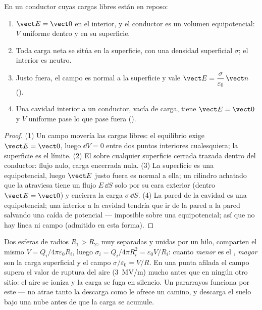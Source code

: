 \begin{theorem}\label{thm:b1:potential-capacitors:conductor}
En un conductor cuyas cargas libres están en reposo:
\begin{enumerate}
  \item $\vect E = \vect 0$ en el interior, y el conductor es un volumen
        equipotencial: $V$ uniforme dentro y en su superficie.
  \item Toda carga neta se sitúa en la superficie, con una densidad
        superficial $\sigma$; el interior es neutro.
  \item Justo fuera, el campo es normal a la superficie y vale
        $\vect E = \dfrac{\sigma}{\varepsilon_0}\,\vect n$ (\emph{}).
  \item Una cavidad interior a un conductor, vacía de carga, tiene $\vect E =
        \vect 0$ y $V$ uniforme pase lo que pase fuera (\emph{}).
\end{enumerate}
\end{theorem}

\begin{proof}
(1) Un campo movería las cargas libres: el equilibrio exige $\vect E =
\vect 0$, luego $\dd V = 0$ entre dos puntos interiores cualesquiera; la
superficie es el límite. (2) El  sobre cualquier
superficie cerrada trazada dentro del conductor: flujo nulo, carga
encerrada nula. (3) La superficie es una equipotencial, luego $\vect E$
justo fuera es normal a ella; un cilindro achatado que la atraviesa tiene
un flujo $E\,\dd S$ solo por su cara exterior (dentro $\vect E = \vect 0$)
y encierra la carga $\sigma\,\dd S$. (4) La pared de la cavidad es una
equipotencial; una  interior a la cavidad tendría que ir de
la pared a la pared salvando una caída de potencial --- imposible sobre
una equipotencial; así que no hay línea ni campo (admitido en esta forma).
\end{proof}

\begin{example}\label{ex:b1:potential-capacitors:point}
Dos esferas de radios $R_1 > R_2$, muy separadas y unidas por un hilo,
comparten el mismo $V = Q_i/4\pi\varepsilon_0R_i$, luego $\sigma_i = Q_i/4\pi R_i^2 = \varepsilon_0V/R_i$:
cuanto \emph{menor} es el , \emph{mayor} son la carga
superficial y el campo $\sigma/\varepsilon_0 = V/R$. En una punta afilada el
campo supera el valor de ruptura del aire (\qty{3}{MV/m}) mucho antes que
en ningún otro sitio: el aire se ioniza y la carga se fuga en silencio. Un
pararrayos funciona por este \emph{} --- no atrae tanto
la descarga como le ofrece un camino, y descarga el suelo bajo una nube
antes de que la carga se acumule.
\end{example}

